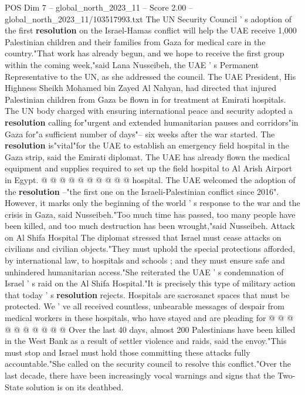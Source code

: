 \begin{textsample}{POS Dim 7 – global\_north\_2023\_11 – Score 2.00 – global\_north\_2023\_11/103517993.txt}  \label{ex:f7_pos_408}
The UN Security Council ' s adoption of the first \textbf{resolution} on the Israel-Hamas conflict will help the UAE receive 1,000 Palestinian children and their families from Gaza for medical care in the country."That work has already begun, and we hope to receive the first group within the coming week,"said Lana Nusseibeh, the UAE ' s Permanent Representative to the UN, as she addressed the council.
The UAE President, His Highness Sheikh Mohamed bin Zayed Al Nahyan, had directed that injured Palestinian children from Gaza be flown in for treatment at Emirati hospitals.
The UN body charged with ensuring international peace and security adopted a \textbf{resolution} calling for"urgent and extended humanitarian pauses and corridors"in Gaza for"a sufficient number of days"-- six weeks after the war started.
The \textbf{resolution} is"vital"for the UAE to establish an emergency field hospital in the Gaza strip, said the Emirati diplomat.
The UAE has already flown the medical equipment and supplies required to set up the field hospital to Al Arish Airport in Egypt. @ @ @ @ @ @ @ @ @ @ hospital.
The UAE welcomed the adoption of the \textbf{resolution} --"the first one on the Israeli-Palestinian conflict since 2016".
However, it marks only the beginning of the world ' s response to the war and the crisis in Gaza, said Nusseibeh."Too much time has passed, too many people have been killed, and too much destruction has been wrought,"said Nusseibeh.
Attack on Al Shifa Hospital The diplomat stressed that Israel must cease attacks on civilians and civilian objects."They must uphold the special protections afforded, by international law, to hospitals and schools ; and they must ensure safe and unhindered humanitarian access."She reiterated the UAE ' s condemnation of Israel ' s raid on the Al Shifa Hospital."It is precisely this type of military action that today ' s \textbf{resolution} rejects.
Hospitals are sacrosanct spaces that must be protected.
We ' ve all received countless, unbearable messages of despair from medical workers in these hospitals, who have stayed and are pleading for @ @ @ @ @ @ @ @ @ @ Over the last 40 days, almost 200 Palestinians have been killed in the West Bank as a result of settler violence and raids, said the envoy."This must stop and Israel must hold those committing these attacks fully accountable."She called on the security council to resolve this conflict."Over the last decade, there have been increasingly vocal warnings and signs that the Two-State solution is on its deathbed.

\end{textsample}
